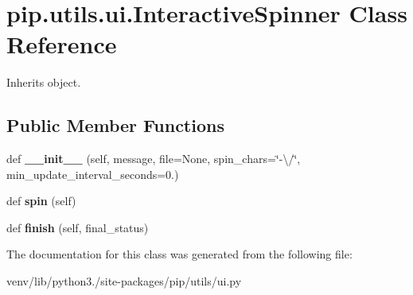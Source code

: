 \hypertarget{classpip_1_1utils_1_1ui_1_1_interactive_spinner}{}\section{pip.\+utils.\+ui.\+Interactive\+Spinner Class Reference}
\label{classpip_1_1utils_1_1ui_1_1_interactive_spinner}


Inherits object.

\subsection*{Public Member Functions}
\begin{DoxyCompactItemize}
\item 
\mbox{\label{classpip_1_1utils_1_1ui_1_1_interactive_spinner_a3246a47f11a295adcc2537adb5534bcb}} 
def {\bfseries \+\_\+\+\_\+init\+\_\+\+\_\+} (self, message, file=None, spin\+\_\+chars=\char`\"{}-\/\textbackslash{}/\char`\"{}, min\+\_\+update\+\_\+interval\+\_\+seconds=0.)
\item 
\mbox{\label{classpip_1_1utils_1_1ui_1_1_interactive_spinner_a91c93d9e343726003cb4d860caf41dc8}} 
def {\bfseries spin} (self)
\item 
\mbox{\label{classpip_1_1utils_1_1ui_1_1_interactive_spinner_ab5fc6396556b38bf1c049720e2ee56aa}} 
def {\bfseries finish} (self, final\+\_\+status)
\end{DoxyCompactItemize}


The documentation for this class was generated from the following file\+:\begin{DoxyCompactItemize}
\item 
venv/lib/python3./site-\/packages/pip/utils/ui.\+py\end{DoxyCompactItemize}

